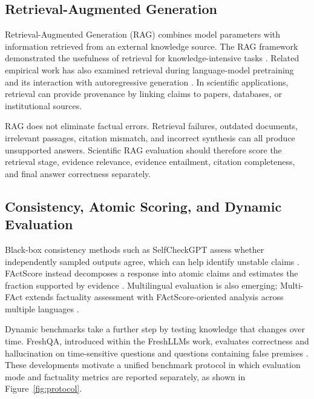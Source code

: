 \documentclass[10pt,a4paper]{article}
\begin{document}
\subsection{Retrieval-Augmented Generation}

Retrieval-Augmented Generation (RAG) combines model parameters with information retrieved from an external knowledge source. The RAG framework demonstrated the usefulness of retrieval for knowledge-intensive tasks \cite{lewis2020rag}. Related empirical work has also examined retrieval during language-model pretraining and its interaction with autoregressive generation \cite{wang2023retrieval}. In scientific applications, retrieval can provide provenance by linking claims to papers, databases, or institutional sources.

RAG does not eliminate factual errors. Retrieval failures, outdated documents, irrelevant passages, citation mismatch, and incorrect synthesis can all produce unsupported answers. Scientific RAG evaluation should therefore score the retrieval stage, evidence relevance, evidence entailment, citation completeness, and final answer correctness separately.

\subsection{Consistency, Atomic Scoring, and Dynamic Evaluation}

Black-box consistency methods such as SelfCheckGPT assess whether independently sampled outputs agree, which can help identify unstable claims \cite{manakul2023selfcheckgpt}. FActScore instead decomposes a response into atomic claims and estimates the fraction supported by evidence \cite{min2023factscore}. Multilingual evaluation is also emerging; Multi-FAct extends factuality assessment with FActScore-oriented analysis across multiple languages \cite{shafayat2024multifact}.

Dynamic benchmarks take a further step by testing knowledge that changes over time. FreshQA, introduced within the FreshLLMs work, evaluates correctness and hallucination on time-sensitive questions and questions containing false premises \cite{vu2024freshllms}. These developments motivate a unified benchmark protocol in which evaluation mode and factuality metrics are reported separately, as shown in Figure~\ref{fig:protocol}.
\end{document}
